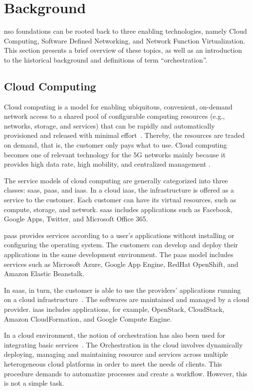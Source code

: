 \section{Background}
\label{sec:background}

\gls{nso} foundations can be rooted back to three enabling technologies, namely Cloud Computing, Software Defined Networking, and Network Function Virtualization. This section presents a brief overview of these topics, as well as an introduction to the historical background and definitions of term ``orchestration''.

\subsection{Cloud Computing}
Cloud computing is a model for enabling ubiquitous, convenient, on-demand network access to a shared pool of configurable computing resources (e.g., networks, storage, and services) that can be rapidly and automatically provisioned and released with minimal effort~\cite{Mell2011TheTechnology}. Thereby, the resources are traded on demand, that is, the customer only pays what to use. Cloud computing becomes one of relevant technology for the 5G networks mainly because it provides high data rate, high mobility, and centralized management \cite{Le2016SurveyNetworks}.

The service models of cloud computing  are generally categorized into three classes: \gls{saas}, \gls{paas}, and \gls{iaas}. In a cloud \gls{iaas}, the infrastructure is offered as a service to the customer. Each customer can have its virtual resources, such as compute, storage, and network. 
\gls{saas} includes applications such as Facebook, Google Apps, Twitter, and Microsoſt Office 365.

\gls{paas} provides services according to a user’s applications without installing or configuring the operating system. The customers can develop and deploy their applications in the same development environment. The \gls{paas} model includes services such as Microsoft Azure, Google App Engine, RedHat OpenShift, and Amazon Elastic Beanstalk.  

In \gls{saas}, in turn, the customer is able to use the providers' applications running on a cloud infrastructure~\cite{Mijumbi2016NetworkChallenges}. The softwares are maintained and managed by a cloud provider. \gls{iaas} includes applications, for example, OpenStack, CloudStack, Amazon CloudFormation, and Google Compute Engine.

In a cloud environment, the notion of orchestration has also been used for integrating basic services~\cite{Vouk2008CloudImplementations}. The Orchestration in the cloud involves dynamically deploying, managing and maintaining resource and services across multiple heterogeneous cloud platforms in order to meet the needs of clients. This procedure demands to automatize processes and create a workflow. However, this is not a simple task.

